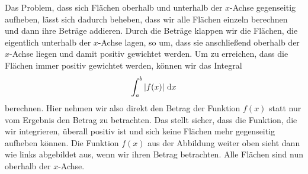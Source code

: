 \documentclass[../../main.tex]{subfiles}
\begin{document}
Das Problem, dass sich Flächen oberhalb und unterhalb der $x$-Achse gegenseitig aufheben, lässt sich dadurch beheben,
dass wir alle Flächen einzeln berechnen und dann ihre Beträge addieren. Durch die Beträge klappen wir die Flächen,
die eigentlich unterhalb der $x$-Achse lagen, so um, dass sie anschließend oberhalb der $x$-Achse liegen und damit
positiv gewichtet werden. Um zu erreichen, dass die Flächen immer positiv gewichtet werden, können wir das Integral
\[\int_a^b|f(x)|\mathop{}\mathrm{d} x\]
berechnen. Hier nehmen wir also direkt den Betrag der Funktion $f(x)$ statt nur vom Ergebnis den Betrag zu betrachten. Das
stellt sicher, dass die Funktion, die wir integrieren, überall positiv ist und sich keine Flächen mehr gegenseitig
aufheben können. Die Funktion $f(x)$ aus der Abbildung weiter oben sieht dann wie links abgebildet aus, wenn wir ihren
Betrag betrachten. Alle Flächen sind nun oberhalb der $x$-Achse.
\end{document}
